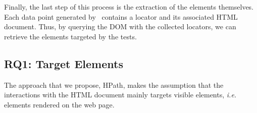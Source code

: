 Finally, the last step of this process is the extraction of the elements themselves. Each data point generated by \mercator\ contains a locator and its associated HTML document. Thus, by querying the DOM with the collected locators, we can retrieve the elements targeted by the tests.

\subsection{RQ1: Target Elements}
\label{sec:hpath-protocol-rq1}



The approach that we propose, HPath, makes the assumption that the interactions with the HTML document mainly targets visible elements, \emph{i.e.} elements rendered on the web page. 

